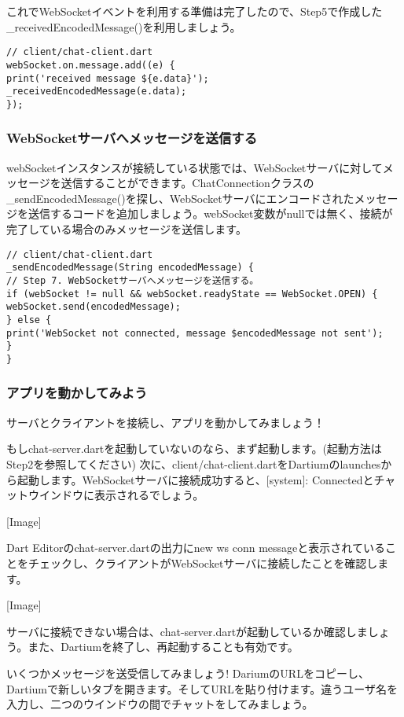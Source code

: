 これでWebSocketイベントを利用する準備は完了したので、Step5で作成した\_receivedEncodedMessage()を利用しましょう。

\begin{verbatim}
// client/chat-client.dart
webSocket.on.message.add((e) {
print('received message ${e.data}');
_receivedEncodedMessage(e.data);
});
\end{verbatim}

\subsubsection{WebSocketサーバへメッセージを送信する}

webSocketインスタンスが接続している状態では、WebSocketサーバに対してメッセージを送信することができます。ChatConnectionクラスの\_sendEncodedMessage()を探し、WebSocketサーバにエンコードされたメッセージを送信するコードを追加しましょう。webSocket変数がnullでは無く、接続が完了している場合のみメッセージを送信します。

\begin{verbatim}
// client/chat-client.dart
_sendEncodedMessage(String encodedMessage) {
// Step 7. WebSocketサーバへメッセージを送信する。
if (webSocket != null && webSocket.readyState == WebSocket.OPEN) {
webSocket.send(encodedMessage);
} else {
print('WebSocket not connected, message $encodedMessage not sent');
}
}
\end{verbatim}

\subsubsection{アプリを動かしてみよう}

サーバとクライアントを接続し、アプリを動かしてみましょう！

もしchat-server.dartを起動していないのなら、まず起動します。(起動方法はStep2を参照してください) 次に、client/chat-client.dartをDartiumのlaunchesから起動します。WebSocketサーバに接続成功すると、[system]: Connectedとチャットウインドウに表示されるでしょう。

[Image]

Dart Editorのchat-server.dartの出力にnew ws conn messageと表示されていることをチェックし、クライアントがWebSocketサーバに接続したことを確認します。

[Image]

サーバに接続できない場合は、chat-server.dartが起動しているか確認しましょう。また、Dartiumを終了し、再起動することも有効です。

いくつかメッセージを送受信してみましょう! DariumのURLをコピーし、Dartiumで新しいタブを開きます。そしてURLを貼り付けます。違うユーザ名を入力し、二つのウインドウの間でチャットをしてみましょう。

